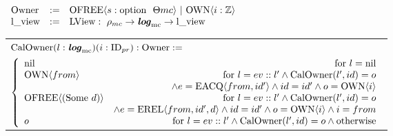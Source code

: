 \begin{figure}

$
\begin{array}{llll}
{\mathrm{Owner}} & := & {\mathrm{OFREE}}\langle s : {\mathrm{option}~{~}}{\Theta{mc}}\rangle~\vert~{\mathrm{OWN}}\langle i : {\mathbb{Z}}\rangle \\
{\mathrm{l}\_\mathrm{view}} & := & {\mathrm{LView}} :~{\rho_{mc}} \rightarrow {\mathrm{\textbf{\textit{log}}}_{\mathrm{mc}}} \rightarrow {\mathrm{l}\_\mathrm{view}} \\
\end{array}
$


\begin{tabular}{l}
$
   {\mathrm{CalOwner}}(l : {\mathrm{\textbf{\textit{log}}}_{\mathrm{mc}}}) (i : {\mathrm{ID}_{pr}}) : {\mathrm{Owner}} :=$\\
   $ \left\{\begin{array}{lr}
        {\mathrm{nil}} & \text{for } l = {\mathrm{nil}} \\
       {{\mathrm{OWN}}\langle{from}\rangle} & \text{for } l = {{ev}::{l'}} \wedge {{\mathrm{CalOwner}}({l'},{id})={o}} \\
                    &\wedge e = {{\mathrm{EACQ}}\langle{from}, {id'}\rangle} \wedge id = id' \wedge o =  {{\mathrm{OWN}}\langle{i}\rangle}  \\
       {{\mathrm{OFREE}}\langle{({\mathrm{Some}}\ d)}\rangle} & \text{for } l = {{ev}::{l'}} \wedge {{\mathrm{CalOwner}}({l'},{id})={o}} \\
                    &\wedge e = {{\mathrm{EREL}}\langle{from}, {id'}, {d}\rangle}  \wedge id = id' \wedge o = {{\mathrm{OWN}}\langle{i}\rangle} \wedge  i = from    \\
       o  & \text{for }  l = {{ev}::{l'}} \wedge {{\mathrm{CalOwner}}({l'},{id})={o}} \wedge \text{otherwise} \\
        \end{array} \right.
$ \\
\end{tabular}

\end{figure}
